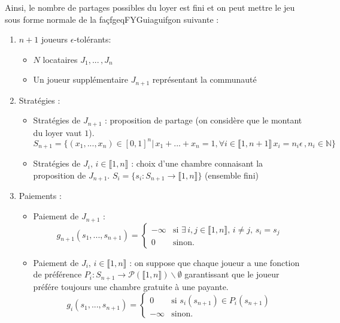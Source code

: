 \documentclass[12pt,twoside,a4paper]{article}
\begin{document}
Ainsi, le nombre de partages possibles du loyer est fini et on peut mettre le jeu sous forme normale de la fa\c{cfgeqFYGuiaguifg}on suivante :

\begin{enumerate}
\item $n+1$ joueurs $\epsilon$-tol\'erants:
	\begin{itemize}
		\item $N$ locataires $J_1, ...\,, J_n$
		\item Un joueur suppl\'ementaire $J_{n+1}$ repr\'esentant la communaut\'e
	\end{itemize}
\item Strat\'egies : 
	\begin{itemize}
		\item Strat\'egies de $J_{n+1}$ : proposition de partage (on consid\`ere que le montant du loyer vaut $1$).\\ $S_{n+1} = \{ (x_1, ..., x_n)\in[0,1]^n |\,  x_1 + ... + x_n=1, \forall i \in \llbracket1,n+1 \rrbracket\, x_i = n_i \epsilon\,, n_i\in\mathbb{N}\}$
		\item Strat\'egies de $J_i,\, i\in \llbracket1,n \rrbracket$ : choix d'une chambre connaisant la proposition de $J_{n+1}$. $S_i = \{ s_i : S_{n+1} \rightarrow \llbracket1,n \rrbracket \}$ (ensemble fini)
	\end{itemize}
\item Paiements :
	\begin{itemize}
		\item Paiement de $J_{n+1}$ :
		$$
			g_{n+1}(s_1, ..., s_{n+1}) = \left\{
    			\begin{array}{ll}
        				-\infty & \mbox{si } \exists\, i,j \in\llbracket 1,n \rrbracket,\, i\neq j,\, s_i = s_j \\
        				0 & \mbox{sinon.}
    			\end{array}
			\right.
		$$
		\item Paiement de $J_{i},\, i\in \llbracket 1,n\rrbracket$ : on suppose que chaque joueur a une fonction de pr\'ef\'erence $P_i : S_{n+1} \rightarrow \mathcal{P}(\llbracket 1,n \rrbracket)\backslash\emptyset$ garantissant que le joueur pr\'ef\'ere toujours une chambre gratuite \`a une payante.
		$$
			g_{i}(s_1, ..., s_{n+1}) = \left\{
    			\begin{array}{ll}
        				0 & \mbox{si } s_i(s_{n+1})\in P_i(s_{n+1}) \\
        				-\infty & \mbox{sinon.}
    			\end{array}
			\right.
		$$
	\end{itemize}
\end{enumerate}
\end{document}
